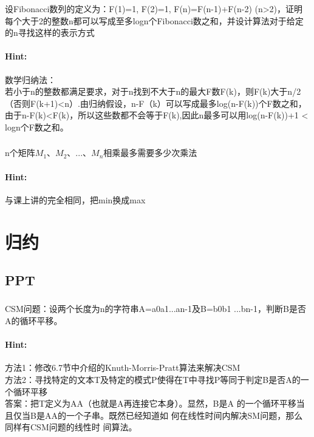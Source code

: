 \documentclass{article}
\begin{document}
     \subsubsection{}设Fibonacci数列的定义为：F(1)=1, F(2)=1, F(n)=F(n-1)+F(n-2) (n>2)，证明每个大于2的整数n都可以写成至多logn个Fibonacci数之和，并设计算法对于给定的n寻找这样的表示方式
     \paragraph{Hint:}数学归纳法：\\
     若小于n的整数都满足要求，对于n找到不大于n的最大F数F(k)，则F(k)大于n/2（否则F(k+1)<n）.由归纳假设，n-F（k）可以写成最多log(n-F(k))个F数之和，由于n-F(k)<F(k)，所以这些数都不会等于F(k),因此n最多可以用log(n-F(k))+1 < logn个F数之和。\\

     
     \subsubsection{}n个矩阵$M_1、M_2、...、M_n$相乘最多需要多少次乘法
     \paragraph{Hint:}与课上讲的完全相同，把min换成max\\
     

     
     \section{归约}
     \subsection{PPT}
     
     \subsubsection{}CSM问题：设两个长度为n的字符串A=a0a1...an-1及B=b0b1
...bn-1，判断B是否A的循环平移。
     \paragraph{Hint:}方法1：修改6.7节中介绍的Knuth-Morris-Pratt算法来解决CSM\\
方法2：寻找特定的文本T及特定的模式P使得在T中寻找P等同于判定B是否A的一个循环平移\\
答案：把T定义为AA（也就是A再连接它本身）。显然，B是A
的一个循环平移当且仅当B是AA的一个子串。既然已经知道如
何在线性时间内解决SM问题，那么同样有CSM问题的线性时
间算法。
\end{document}
